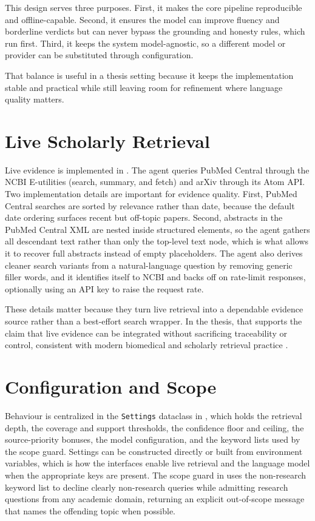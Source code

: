 This design serves three purposes. First, it makes the core pipeline reproducible and offline-capable. Second, it
ensures the model can improve fluency and borderline verdicts but can never bypass the grounding and honesty rules,
which run first. Third, it keeps the system model-agnostic, so a different model or provider can be substituted
through configuration.

That balance is useful in a thesis setting because it keeps the implementation stable and practical while still
leaving room for refinement where language quality matters.

\section{Live Scholarly Retrieval }

Live evidence is implemented in . The agent queries PubMed Central through the NCBI
E-utilities (search, summary, and fetch) and arXiv through its Atom API. Two implementation details are important
for evidence quality. First, PubMed Central searches are sorted by relevance rather than date, because the default
date ordering surfaces recent but off-topic papers. Second, abstracts in the PubMed Central XML are nested inside
structured elements, so the agent gathers all descendant text rather than only the top-level text node, which is
what allows it to recover full abstracts instead of empty placeholders. The agent also derives cleaner search
variants from a natural-language question by removing generic filler words, and it identifies itself to NCBI and
backs off on rate-limit responses, optionally using an API key to raise the request rate.

These details matter because they turn live retrieval into a dependable evidence source rather than a best-effort
search wrapper. In the thesis, that supports the claim that live evidence can be integrated without sacrificing
traceability or control, consistent with modern biomedical and scholarly retrieval practice \cite{gu2021pubmedbert,lee2019biobert,thakur2021beir}.

\section{Configuration and Scope }

Behaviour is centralized in the \texttt{Settings} dataclass in , which holds the retrieval depth,
the coverage and support thresholds, the confidence floor and ceiling, the source-priority bonuses, the model
configuration, and the keyword lists used by the scope guard. Settings can be constructed directly or built from
environment variables, which is how the interfaces enable live retrieval and the language model when the
appropriate keys are present. The scope guard in  uses the non-research keyword list to decline
clearly non-research queries while admitting research questions from any academic domain, returning an explicit
out-of-scope message that names the offending topic when possible.

